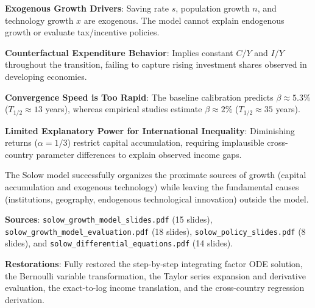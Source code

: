 \documentclass[11pt]{article}
\begin{document}
\begin{flatnum}
  \item \textbf{Exogenous Growth Drivers}: Saving rate $s$, population growth $n$, and technology growth $x$ are exogenous. The model cannot explain endogenous growth or evaluate tax/incentive policies.
  \item \textbf{Counterfactual Expenditure Behavior}: Implies constant $C/Y$ and $I/Y$ throughout the transition, failing to capture rising investment shares observed in developing economies.
  \item \textbf{Convergence Speed is Too Rapid}: The baseline calibration predicts $\beta \approx 5.3\%$ ($T_{1/2} \approx 13$ years), whereas empirical studies estimate $\beta \approx 2\%$ ($T_{1/2} \approx 35$ years).
  \item \textbf{Limited Explanatory Power for International Inequality}: Diminishing returns ($\alpha = 1/3$) restrict capital accumulation, requiring implausible cross-country parameter differences to explain observed income gaps.
\end{flatnum}

 The Solow model successfully organizes the proximate sources of growth (capital accumulation and exogenous technology) while leaving the fundamental causes (institutions, geography, endogenous technological innovation) outside the model.

\begin{transcriptnotes}
  \item \textbf{Sources}: \texttt{solow\_growth\_model\_slides.pdf} (15 slides), \texttt{solow\_growth\_model\_evaluation.pdf} (18 slides), \texttt{solow\_policy\_slides.pdf} (8 slides), and \texttt{solow\_differential\_equations.pdf} (14 slides).
  \item \textbf{Restorations}: Fully restored the step-by-step integrating factor ODE solution, the Bernoulli variable transformation, the Taylor series expansion and derivative evaluation, the exact-to-log income translation, and the cross-country regression derivation.
\end{transcriptnotes}
\end{document}

